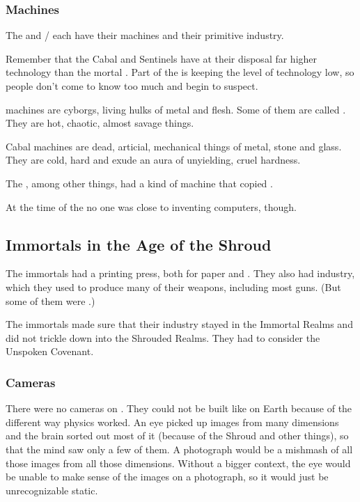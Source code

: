 \subsubsection{Machines}
The \dragons{} and \banes/\resphain{} each have their machines and their primitive industry. 

Remember that the Cabal and Sentinels have at their disposal far higher technology than the mortal \Miithians. 
Part of the \charade{} is keeping the level of technology low, so people don't come to know too much and begin to suspect.

\Draconic{} machines are cyborgs, living hulks of metal and flesh. 
Some of them are called \colossi. They are hot, chaotic, almost savage things. 

Cabal machines are dead, articial, mechanical things of metal, stone and glass. They are cold, hard and exude an aura of unyielding, cruel hardness. 

The \resphain, among other things, had a kind of machine that copied . 

At the time of the \thirdbanewar{} no one was close to inventing computers, though. 









\subsection{Immortals in the {Age of the Shroud}}
The immortals had a printing press, both for paper and .
They also had industry, which they used to produce many of their weapons, including most guns. 
(But some of them were .)

The immortals made sure that their industry stayed in the Immortal Realms and did not trickle down into the Shrouded Realms.
They had to consider the Unspoken Covenant.





\subsubsection{Cameras}
There were no cameras on \Miith. 
They could not be built like on Earth because of the different way \Miithian physics worked. 
An eye picked up images from many dimensions and the brain sorted out most of it (because of the Shroud and other things), so that the mind saw only a few of them. 
A photograph would be a mishmash of all those images from all those dimensions. 
Without a bigger context, the eye would be unable to make sense of the images on a photograph, so it would just be unrecognizable static. 

